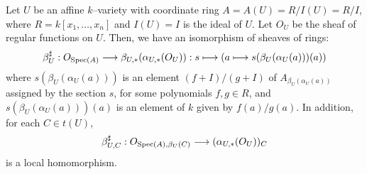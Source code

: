 \begin{lem}\label{lem:schemat-reg-fun}
Let $U$ be an affine $k$--variety with coordinate ring
$A = A(U) = R/I(U) = R/I$, where $R = k[x_1, \dots, x_n]$ and $I(U) = I$
is the ideal of $U$. Let $O_U$ be the sheaf of regular functions on $U$.
Then, we have an isomorphism of sheaves of rings:
\[
\beta_U^\sharp : O_{\Spec(A)} \to \beta_{U, *}(\alpha_{U, *}(O_U))
    : s \mapsto (a \mapsto s(\beta_U(\alpha_U(a)))(a))
\]
where $s(\beta_U(\alpha_U(a)))$ is an element $(f + I)/(g + I)$ of
$A_{\beta_U(\alpha_U(a))}$
assigned by the section $s$, for some polynomials $f, g \in R$, and
$s(\beta_U(\alpha_U(a)))(a)$ is an element of $k$ given by $f(a)/g(a)$.
In addition, for each $C \in t(U)$,
\[
\beta_{U, C}^\sharp : O_{\Spec(A), \beta_U(C)}
\to (\alpha_{U, *}(O_U))_C
\]
is a local homomorphism.
\end{lem}
